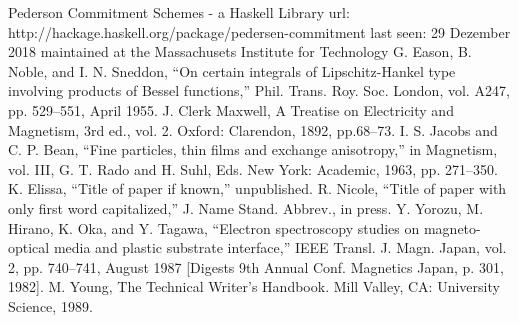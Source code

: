 \documentclass[conference]{IEEEtran}
\begin{document}
\begin{thebibliography}{00}
	 Pederson Commitment Schemes - a Haskell Library url: http://hackage.haskell.org/package/pedersen-commitment 
	last seen: 29 Dezember 2018
	maintained at the Massachusets Institute for Technology
 G. Eason, B. Noble, and I. N. Sneddon, ``On certain integrals of Lipschitz-Hankel type involving products of Bessel functions,'' Phil. Trans. Roy. Soc. London, vol. A247, pp. 529--551, April 1955.
 J. Clerk Maxwell, A Treatise on Electricity and Magnetism, 3rd ed., vol. 2. Oxford: Clarendon, 1892, pp.68--73.
 I. S. Jacobs and C. P. Bean, ``Fine particles, thin films and exchange anisotropy,'' in Magnetism, vol. III, G. T. Rado and H. Suhl, Eds. New York: Academic, 1963, pp. 271--350.
 K. Elissa, ``Title of paper if known,'' unpublished.
 R. Nicole, ``Title of paper with only first word capitalized,'' J. Name Stand. Abbrev., in press.
 Y. Yorozu, M. Hirano, K. Oka, and Y. Tagawa, ``Electron spectroscopy studies on magneto-optical media and plastic substrate interface,'' IEEE Transl. J. Magn. Japan, vol. 2, pp. 740--741, August 1987 [Digests 9th Annual Conf. Magnetics Japan, p. 301, 1982].
 M. Young, The Technical Writer's Handbook. Mill Valley, CA: University Science, 1989.
\end{thebibliography}
\vspace{12pt}
\end{document}

